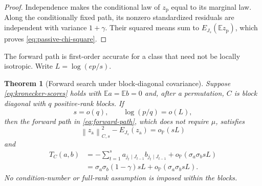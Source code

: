 \documentclass[a4paper,11pt,english]{article}
\newtheorem{theorem}{Theorem}[section]
\newcommand{\E}{\mathbb E}
\newcommand{\Prob}{\mathbb P}
\newcommand{\norm}[1]{\left\lVert #1\right\rVert}
\begin{document}
\begin{proof}
Independence makes the conditional law of $z_{\mathrm p}$ equal to its marginal
law.  Along the conditionally fixed path, its nonzero standardized
residuals are independent with variance $1+\gamma$.  Their squared means
sum to $E_{J_s}(\E z_{\mathrm p})$, which proves
\eqref{eq:passive-chi-square}.
\end{proof}

The forward path is first-order accurate for a class that need not be
locally isotropic.  Write $L=\log(ep/s)$.

\begin{theorem}[Forward search under block-diagonal covariance]
\label{thm:block-products}
Suppose \eqref{eq:kronecker-scores} holds with
$\E a=\E b=0$ and, after a permutation, $C$ is block diagonal with $q$
positive-rank blocks.  If
\begin{equation}\label{eq:block-regime}
        s=o(q),
        \qquad
        \log(p/q)=o(L),
\end{equation}
then the forward path in \eqref{eq:forward-path}, which does not require
$\mu$, satisfies
\begin{equation}\label{eq:block-active-gap}
        \norm{z_{\mathrm a}}_{C,s}^2-E_{J_s}(z_{\mathrm a})
        =o_{\Prob}(sL)
\end{equation}
and
\begin{equation}\label{eq:block-product-approximation}
\begin{split}
        T_C(a,b)
        &=-\sum_{t=1}^s
        a_{j_t\mid J_{t-1}}b_{j_t\mid J_{t-1}}
        +o_{\Prob}(\sigma_a\sigma_b sL)\\
        &=\sigma_a\sigma_b(1-\gamma)sL
        +o_{\Prob}(\sigma_a\sigma_b sL).
\end{split}
\end{equation}
No condition-number or full-rank assumption is imposed within the blocks.
\end{theorem}
\end{document}
